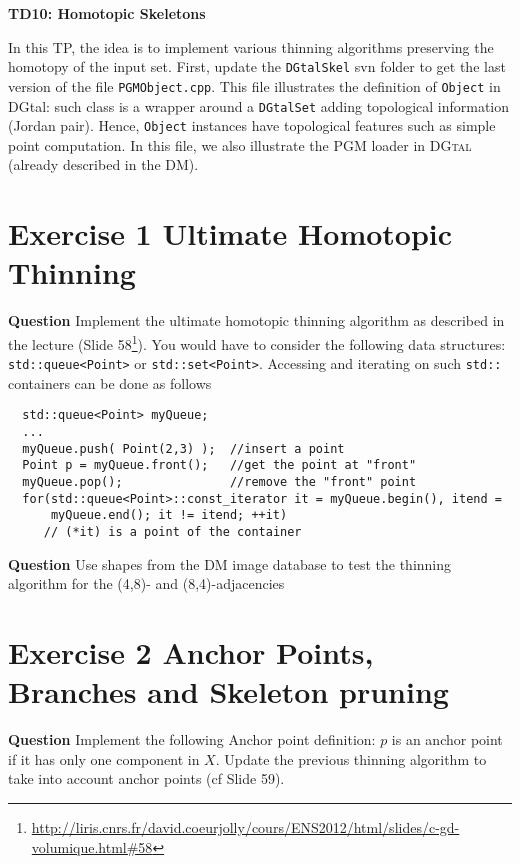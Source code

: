\documentclass[a4paper, 11pt]{article}
\title{}
\author{}
\date{}
\begin{document}
\begin{center}
	\LARGE \textbf{TD10: Homotopic Skeletons}
\end{center}

\bigskip
\par In this TP, the idea is to implement various thinning algorithms preserving the homotopy of the input set. First, update the \texttt{DGtalSkel} svn folder to get the last version of the file \texttt{PGMObject.cpp}. This file illustrates the definition of \texttt{Object} in DGtal: such class is a wrapper around a \texttt{DGtalSet} adding topological information (Jordan pair). Hence, \texttt{Object} instances have topological features such as simple point computation. In this file, we also illustrate the PGM loader in \textsc{DGtal} (already described in the DM).

\section*{Exercise 1 \rm Ultimate Homotopic Thinning}

{\bf Question} Implement the ultimate homotopic thinning algorithm as described in the lecture (Slide 58\footnote{\url{http://liris.cnrs.fr/david.coeurjolly/cours/ENS2012/html/slides/c-gd-volumique.html\#58}}). You would have to consider the following data structures: \texttt{std::queue<Point>} or \texttt{std::set<Point>}. Accessing and iterating on such \texttt{std::} containers can be done as follows
\begin{verbatim}
  std::queue<Point> myQueue;
  ...
  myQueue.push( Point(2,3) );  //insert a point
  Point p = myQueue.front();   //get the point at "front"
  myQueue.pop();               //remove the "front" point
  for(std::queue<Point>::const_iterator it = myQueue.begin(), itend =
      myQueue.end(); it != itend; ++it)
     // (*it) is a point of the container
\end{verbatim}

{\bf Question} Use shapes from the DM image database to test the thinning algorithm for the (4,8)- and (8,4)-adjacencies

\section*{Exercise 2 \rm Anchor Points, Branches and Skeleton pruning}

{\bf Question} Implement the following Anchor point definition: $p$ is an anchor point if it has only one component in $X$. Update the previous thinning algorithm to take into account anchor points (cf Slide 59).
\end{document}
